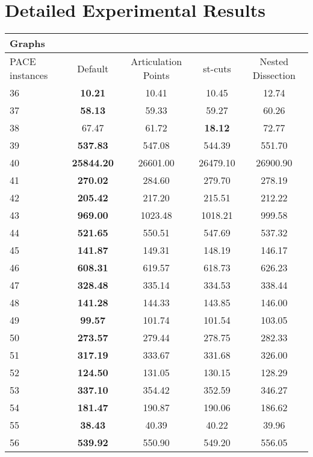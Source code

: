 \documentclass[a4paper,UKenglish,cleveref, autoref, thm-restate]{lipics-v2021}
\begin{document}
\section{Detailed Experimental Results}
\begin{table}
	\begin{center}
		\begin{tabular}{|l|c|c|c|c|}
			\multicolumn{5}{|l|}{Graphs}\\
			\hline
			PACE instances & Default & Articulation Points & st-cuts & Nested Dissection \\
			\hline
			36 & \textbf{10.21} & 10.41 & 10.45 & 12.74 \\
			37 & \textbf{58.13} & 59.33 & 59.27 & 60.26 \\
			38 & 67.47 & 61.72 & \textbf{18.12} & 72.77 \\
			39 & \textbf{537.83} & 547.08 & 544.39 & 551.70 \\
			40 & \textbf{25844.20} & 26601.00 & 26479.10 & 26900.90 \\
			41 & \textbf{270.02} & 284.60 & 279.70 & 278.19 \\
			42 & \textbf{205.42} & 217.20 & 215.51 & 212.22 \\
			43 & \textbf{969.00} & 1023.48 & 1018.21 & 999.58 \\
			44 & \textbf{521.65} & 550.51 & 547.69 & 537.32 \\
			45 & \textbf{141.87} & 149.31 & 148.19 & 146.17 \\
			46 & \textbf{608.31} & 619.57 & 618.73 & 626.23 \\
			47 & \textbf{328.48} & 335.14 & 334.53 & 338.44 \\
			48 & \textbf{141.28} & 144.33 & 143.85 & 146.00 \\
			49 & \textbf{99.57} & 101.74 & 101.54 & 103.05 \\
			50 & \textbf{273.57} & 279.44 & 278.75 & 282.33 \\
			51 & \textbf{317.19} & 333.67 & 331.68 & 326.00 \\
			52 & \textbf{124.50} & 131.05 & 130.15 & 128.29 \\
			53 & \textbf{337.10} & 354.42 & 352.59 & 346.27 \\
			54 & \textbf{181.47} & 190.87 & 190.06 & 186.62 \\
			55 & \textbf{38.43} & 40.39 & 40.22 & 39.96 \\
			56 & \textbf{539.92} & 550.90 & 549.20 & 556.05 \\

\end{tabular}
\end{center}
\end{table}
\end{document}
